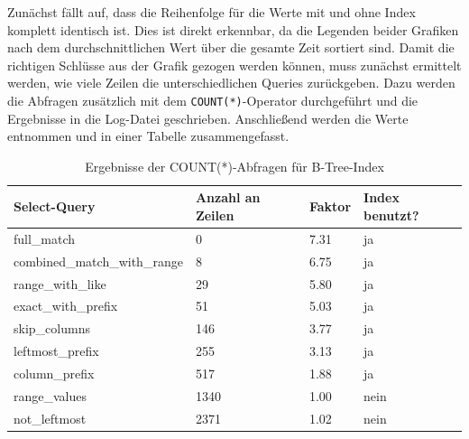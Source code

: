Zunächst fällt auf, dass die Reihenfolge für die Werte mit und ohne Index komplett identisch ist.
Dies ist direkt erkennbar, da die Legenden beider Grafiken nach dem durchschnittlichen Wert über die gesamte Zeit sortiert sind.
Damit die richtigen Schlüsse aus der Grafik gezogen werden können, muss zunächst ermittelt werden, wie viele Zeilen die unterschiedlichen Queries zurückgeben.
Dazu werden die Abfragen zusätzlich mit dem \texttt{COUNT(*)}-Operator durchgeführt und die Ergebnisse in die Log-Datei geschrieben.
Anschließend werden die Werte entnommen und in einer Tabelle zusammengefasst.

\vspace{-5pt}
\begin{table}[H]
    \centering
    \scriptsize
    \begin{tabular}{|l|l|l|l|}
        \hline
        \textbf{Select-Query} & \textbf{Anzahl an Zeilen} & \textbf{Faktor} & \textbf{Index benutzt?} \\
        \hline
        full\_match & 0 & 7.31 & ja \\
        combined\_match\_with\_range & 8 & 6.75 & ja \\
        range\_with\_like & 29 & 5.80 & ja \\
        exact\_with\_prefix & 51 & 5.03 & ja \\
        skip\_columns & 146 & 3.77 & ja \\
        leftmost\_prefix & 255 & 3.13 & ja \\
        column\_prefix & 517 & 1.88 & ja \\
        range\_values & 1340 & 1.00 & nein \\
        not\_leftmost & 2371 & 1.02 & nein \\
        \hline
    \end{tabular}
    \vspace{3pt}
    \caption{Ergebnisse der COUNT(*)-Abfragen für B-Tree-Index}
    \label{tab:indexing_b_tree_count_results}
\end{table}
\vspace{-25pt}

